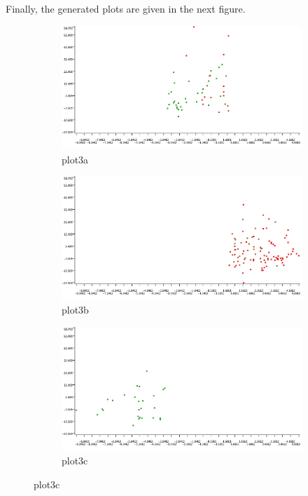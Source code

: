 \documentclass[11pt]{article}
\begin{document}
			
			Finally, the generated plots are given in the next figure.
			\iffalse
			 \begin{figure}[H]
			 	\centering
			 	\begin{subfigure}{0.4\textwidth}
			 		\includegraphics[width=\textwidth]{res/t1/t14/t14-plota}
			 		\caption{plot3a}
			 		\label{fig:first}
			 	\end{subfigure}
			 	\hfill
			 	\begin{subfigure}{0.4\textwidth}
			 		\includegraphics[width=\textwidth]{res/t1/t14/t14-plotb}
			 		\caption{plot3b}
			 		\label{fig:second}
			 	\end{subfigure}
			 	\hfill
			 	\begin{subfigure}{0.4\textwidth}
			 		\includegraphics[width=\textwidth]{res/t1/t14/t14-plotc}
			 		\caption{plot3c}
			 		\label{fig:third}
			 	\end{subfigure}
			 	\label{fig:figures} 
			 \end{figure}
\end{document}
